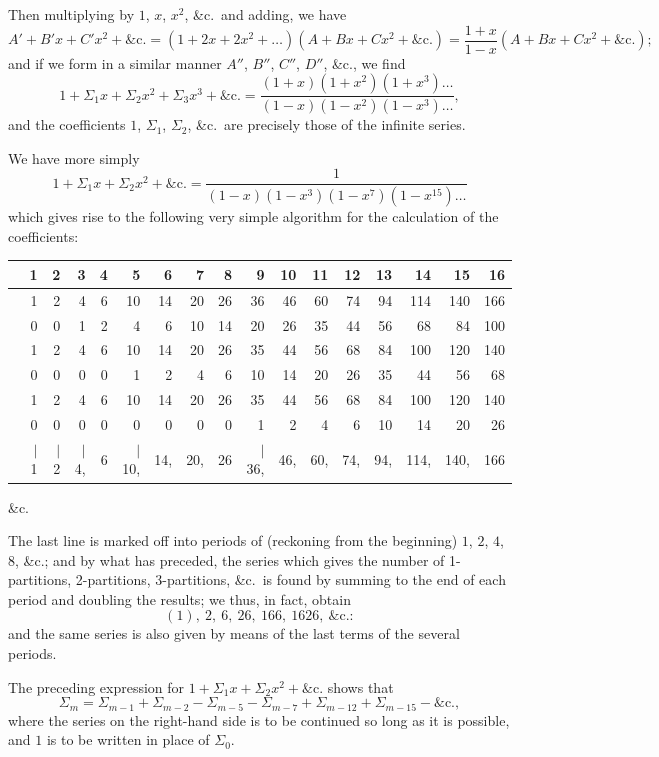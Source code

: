 \documentclass[11pt,a4paper]{book}
\begin{document}
Then multiplying by $1$, $x$, $x^2$, \&c.\ and adding, we have
\[
A' + B'x + C'x^2 + \&\text{c.} = (1 + 2x + 2x^2 + \ldots)(A + Bx + Cx^2 + \&\text{c.}) = \frac{1+x}{1-x}(A + Bx + Cx^2 + \&\text{c.});
\]
and if we form in a similar manner $A''$, $B''$, $C''$, $D''$, \&c., we find
\[
1 + \Sigma_1 x + \Sigma_2 x^2 + \Sigma_3 x^3 + \&\text{c.} = \frac{(1+x)(1+x^2)(1+x^3)\ldots}{(1-x)(1-x^2)(1-x^3)\ldots},
\]
and the coefficients $1$, $\Sigma_1$, $\Sigma_2$, \&c.\ are precisely those of the infinite series.

We have more simply
\[
1 + \Sigma_1 x + \Sigma_2 x^2 + \&\text{c.} = \frac{1}{(1-x)(1-x^3)(1-x^7)(1-x^{15})\ldots}
\]
which gives rise to the following very simple algorithm for the calculation of the coefficients:
\begin{center}
\begin{tabular}{r|rrrrrrrrrrrrrrrr}
& 1 & 2 & 3 & 4 & 5 & 6 & 7 & 8 & 9 & 10 & 11 & 12 & 13 & 14 & 15 & 16 \\
\hline
& 1 & 2 & 4 & 6 & 10 & 14 & 20 & 26 & 36 & 46 & 60 & 74 & 94 & 114 & 140 & 166 \\
& 0 & 0 & 1 & 2 & 4 & 6 & 10 & 14 & 20 & 26 & 35 & 44 & 56 & 68 & 84 & 100 \\
& 1 & 2 & 4 & 6 & 10 & 14 & 20 & 26 & 35 & 44 & 56 & 68 & 84 & 100 & 120 & 140 \\
& 0 & 0 & 0 & 0 & 1 & 2 & 4 & 6 & 10 & 14 & 20 & 26 & 35 & 44 & 56 & 68 \\
& 1 & 2 & 4 & 6 & 10 & 14 & 20 & 26 & 35 & 44 & 56 & 68 & 84 & 100 & 120 & 140 \\
& 0 & 0 & 0 & 0 & 0 & 0 & 0 & 0 & 1 & 2 & 4 & 6 & 10 & 14 & 20 & 26 \\
\hline
& $|$ 1 & $|$ 2 & $|$ 4, & 6 & $|$ 10, & 14, & 20, & 26 & $|$ 36, & 46, & 60, & 74, & 94, & 114, & 140, & 166 \\
\end{tabular}
\end{center}
\&c.

The last line is marked off into periods of (reckoning from the beginning) $1$, $2$, $4$, $8$, \&c.; and by what has preceded, the series which gives the number of 1-partitions, 2-partitions, 3-partitions, \&c.\ is found by summing to the end of each period and doubling the results; we thus, in fact, obtain
\[
(1),\ 2,\ 6,\ 26,\ 166,\ 1626,\ \&\text{c.}:
\]
and the same series is also given by means of the last terms of the several periods.

The preceding expression for $1 + \Sigma_1 x + \Sigma_2 x^2 + \&\text{c.}$
shows that
\[
\Sigma_m = \Sigma_{m-1} + \Sigma_{m-2} - \Sigma_{m-5} - \Sigma_{m-7} + \Sigma_{m-12} + \Sigma_{m-15} - \&\text{c.},
\]
where the series on the right-hand side is to be continued so long as it is possible, and $1$ is to be written in place of $\Sigma_0$.
\end{document}
